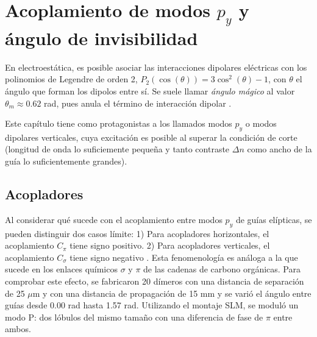 \chapter{Acoplamiento de modos $p_y$ y ángulo de invisibilidad}
En electroestática, es posible asociar las interacciones dipolares eléctricas con los polinomios de Legendre de orden 2, $P_2(\cos(\theta))=3\cos^2(\theta)-1$, con $\theta$ el ángulo que forman los dipolos entre sí. Se suele llamar \textit{ángulo mágico} al valor $\theta_m \approx 0.62$ rad, pues anula el término de interacción dipolar \citep{medmagic}. 

Este capítulo tiene como protagonistas a los llamados modos $p_y$ o modos dipolares verticales, cuya excitación es posible al superar la condición de corte (longitud de onda lo suficiemente pequeña y tanto contraste $\Delta n$ como ancho de la guía lo suficientemente grandes).



\section{Acopladores}
Al considerar qué sucede con el acoplamiento entre modos $p_y$ de guías elípticas, se pueden distinguir dos casos límite: 1) Para acopladores horizontales, el acoplamiento $C_\pi$ tiene signo positivo. 2) Para acopladores verticales, el acoplamiento $C_\sigma$ tiene signo negativo \cite{Pmodecoupling}. Esta fenomenología es análoga a la que sucede en los enlaces químicos $\sigma$ y $\pi$ de las cadenas de carbono orgánicas. Para comprobar este efecto, se fabricaron 20 dímeros con una distancia de separación de 25 $\mu$m y con una distancia de propagación de 15 mm y se varió el ángulo entre guías desde 0.00 rad hasta 1.57 rad. Utilizando el montaje SLM, se moduló un modo P: dos lóbulos del mismo tamaño con una diferencia de fase de $\pi$ entre ambos.


